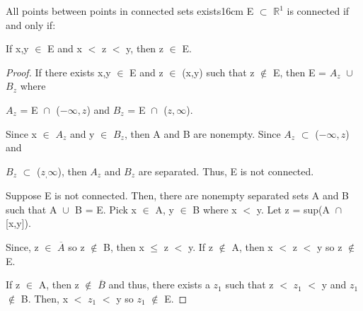 	\vspace{0.5cm}



	\begin{wtheorem}{All points between points in connected sets exists}{16cm}
		E $\subset$ $\mathbb{R}^1$ is connected if and only if:

		\hspace{0.5cm}
		If x,y $\in$ E and x $<$ z $<$ y, then z $\in$ E.
	\end{wtheorem}
	
	\begin{proof}
		If there exists x,y $\in$ E and z $\in$ (x,y) such that z $\not \in$ E,
		then E = $A_z$ $\cup_{}^{}$ $B_z$ where
		
		$A_z$ = E $\cap_{}^{}$ ($-\infty,z$)
		and $B_z$ = E $\cap_{}^{}$ ($z,\infty$).

		Since x $\in$ $A_z$ and y $\in$ $B_z$, then A and B are nonempty.
		Since $A_z$ $\subset$ ($-\infty,z$) and
		
		$B_z$ $\subset$ ($z_,\infty$),
		then $A_z$ and $B_z$ are separated. Thus, E is not connected.

		\vspace{0.2cm}

		Suppose E is not connected. Then, there are nonempty separated sets
		A and B such that A $\cup_{}^{}$ B = E. Pick x $\in$ A, y $\in$ B
		where x $<$ y. Let z = sup(A $\cap_{}^{}$ [x,y]).

		Since, z $\in$ $\overline{A}$ so z $\not \in$ B, then x $\leq$ z $<$ y.
		If z $\not \in$ A, then x $<$ z $<$ y so z $\not \in$ E.

		If z $\in$ A, then z $\not \in$ $\overline{B}$ and thus,
		there exists a $z_1$ such that z $<$ $z_1$ $<$ y and $z_1$ $\not \in$ B.
		Then, x $<$ $z_1$ $<$ y so $z_1$ $\not \in$ E.
	\end{proof}




